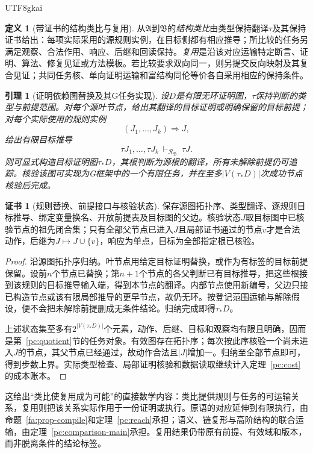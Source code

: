 \documentclass[11pt,a4paper]{article}
\theoremstyle{plain}
\newtheorem{lemma}[theorem]{引理}
\theoremstyle{definition}
\newtheorem{definition}[theorem]{定义}
\newtheorem*{certificate}{证书}
\theoremstyle{remark}
\begin{document}
\begin{CJK*}{UTF8}{gkai}
\begin{definition}[带证书的结构类比与复用]
从$\mathfrak A$到$\mathfrak B$的\emph{结构类比}由类型保持翻译$\tau$及其保持证书给出：每项实际采用的源规则实例，在目标侧都有相应推导；所比较的任务另满足观察、合法作用、响应、后继和回读保持。\emph{复用}是沿该对应运输特定断言、证明、算法、修复见证或方法模板。若比较要求双向同一，则另提交反向映射及其复合见证；共同任务核、单向证明运输和富结构同伦等价各自采用相应的保持条件。
\end{definition}

\begin{lemma}[证明依赖图替换及其G任务实现]
\label{ar:dag-transport}
设$D$是有限无环证明图，$\tau$保持判断的类型与前提范围。对每个源叶节点，给出其翻译的目标证明或明确保留的目标前提；对每个实际使用的规则实例
\[
 (J_1,\ldots,J_k)\Longrightarrow J,
\]
给出有限目标推导
\[
 \tau J_1,\ldots,\tau J_k\ \vdash_{\mathcal R_{\mathfrak B}}\ \tau J.
\]
则可显式构造目标证明图$\tau_*D$，其根判断为源根的翻译，所有未解除前提仍可追踪。核验该图可实现为G框架中的一个有限任务，并在至多$|V(\tau_*D)|$次成功节点核验后完成。
\end{lemma}
\begin{certificate}[规则替换、前提接口与核验状态]
保存源图拓扑序、类型翻译、逐规则目标推导、绑定变量换名、开放前提表及目标图的父边。核验状态$J$取目标图中已核验节点的祖先闭合集；只有全部父节点已进入$J$且局部证书通过的节点$v$才是合法动作，后继为$J\mapsto J\cup\{v\}$，响应为单点，目标为全部指定根已核验。
\end{certificate}
\begin{proof}
沿源图拓扑序归纳。叶节点用给定目标证明替换，或作为有标签的目标前提保留。设前$n$个节点已替换；第$n+1$个节点的各父判断已有目标推导，把这些根接到该规则的目标推导输入端，得到本节点的翻译。内部节点使用新编号，父边只接已构造节点或该有限局部推导的更早节点，故仍无环。按登记范围运输与解除假设，便不会把未解除前提删成无条件结论。归纳完成即得$\tau_*D$。

上述状态集至多有$2^{|V(\tau_*D)|}$个元素，动作、后继、目标和观察均有限且明确，因而是第~\ref{pc:quotient}节的任务对象。有效图存在拓扑序；每次按此序核验一个尚未进入$J$的节点，其父节点已经通过，故动作合法且$|J|$增加一。归纳至全部节点即可，得到步数上界。实际类型检查、局部证明核验和数据读取继续计入定理~\ref{pc:cost}的成本账本。
\end{proof}

这给出“类比使复用成为可能”的直接数学内容：类比提供规则与任务的可运输关系，复用则把该关系实际作用于一份证明或执行。原语的对应延伸到有限执行，由命题~\ref{fa:prop-compile}和定理~\ref{pc:reach}承担；语义、链复形与高阶结构的联合运输，由定理~\ref{pc:comparison-main}承担。复用结果仍带原有前提、有效域和版本，而非脱离条件的结论标签。


\end{CJK*}
\end{document}
